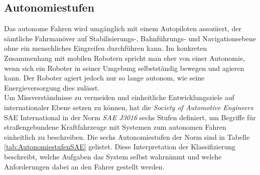 \subsection{Autonomiestufen} \label{subsec:Autonomiestufen}%
Das autonome Fahren wird umgänglich mit einem Autopiloten assoziiert, der sämtliche Fahrmanöver auf Stabilisierungs-, Bahnführungs- und Navigationsebene ohne ein menschliches Eingreifen durchführen kann. Im konkreten Zusammenhang mit mobilen Robotern spricht man eher von einer Autonomie, wenn sich ein Roboter in seiner Umgebung selbstständig bewegen und agieren kann. Der Roboter agiert jedoch nur so lange autonom, wie seine Energieversorgung dies zulässt.\\
Um Missverständnisse zu vermeiden und einheitliche Entwicklungsziele auf internationaler Ebene setzen zu können, hat die \emph{Society of Automotive Engineers} \acs{SAE} International in der Norm \emph{SAE J3016} \cite{SAEInternational.15.06.2018} sechs Stufen definiert, um Begriffe für straßengebundene Kraftfahrzeuge mit Systemen zum autonomen Fahren einheitlich zu beschreiben. Die sechs Autonomiestufen der Norm sind in Tabelle \ref{tab:AutonomiestufenSAE} gelistet. Diese Interpretation der Klassifizierung beschreibt, welche Aufgaben das System selbst wahrnimmt und welche Anforderungen dabei an den Fahrer gestellt werden.

